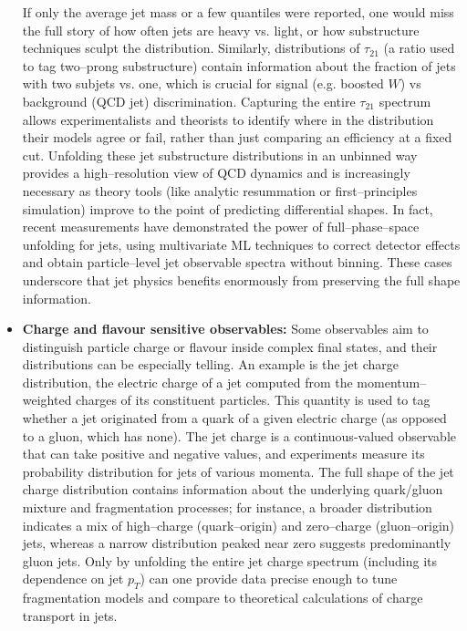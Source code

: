 \begin{itemize}
            If only the average jet mass or a few quantiles were reported, one would miss the full story of how often jets are heavy vs. light, or how substructure techniques sculpt the distribution.
            Similarly, distributions of $\tau_{21}$ (a ratio used to tag two--prong substructure) contain information about the fraction of jets with two subjets vs. one, which is crucial for signal (e.g. boosted $W$) vs background (QCD jet) discrimination.
            Capturing the entire $\tau_{21}$ spectrum allows experimentalists and theorists to identify where in the distribution their models agree or fail, rather than just comparing an efficiency at a fixed cut.
            Unfolding these jet substructure distributions in an unbinned way provides a high--resolution view of QCD dynamics and is increasingly necessary as theory tools (like analytic resummation or first--principles simulation) improve to the point of predicting differential shapes.
            In fact, recent measurements have demonstrated the power of full--phase--space unfolding for jets, using multivariate ML techniques to correct detector effects and obtain particle--level jet observable spectra without binning.
            These cases underscore that jet physics benefits enormously from preserving the full shape information.
        \item \textbf{Charge and flavour sensitive observables:}
            Some observables aim to distinguish particle charge or flavour inside complex final states, and their distributions can be especially telling.
            An example is the jet charge distribution, the electric charge of a jet computed from the momentum--weighted charges of its constituent particles.
            This quantity is used to tag whether a jet originated from a quark of a given electric charge (as opposed to a gluon, which has none).
            The jet charge is a continuous-valued observable that can take positive and negative values, and experiments measure its probability distribution for jets of various momenta.
            The full shape of the jet charge distribution contains information about the underlying quark/gluon mixture and fragmentation processes;
            for instance, a broader distribution indicates a mix of high--charge (quark--origin) and zero--charge (gluon--origin) jets, whereas a narrow distribution peaked near zero suggests predominantly gluon jets.
            Only by unfolding the entire jet charge spectrum (including its dependence on jet $p_T$) can one provide data precise enough to tune fragmentation models and compare to theoretical calculations of charge transport in jets.
            

\end{itemize}
